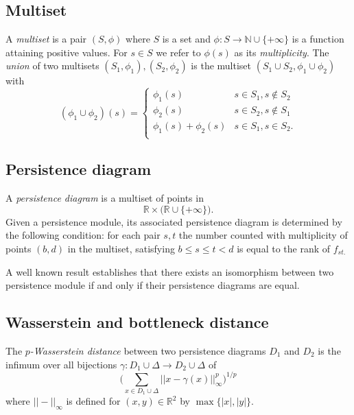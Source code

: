 \documentclass{amsart}
\begin{document}
	\subsection*{Multiset} \label{multiset}
	
	A \textit{multiset} is a pair $(S, \phi)$ where $S$ is a set and $\phi : S \to \mathbb N \cup \{+\infty\}$ is a function attaining positive values. For $s \in S$ we refer to $\phi(s)$ as its \textit{multiplicity}. The \textit{union} of two multisets $(S_1, \phi_1), (S_2, \phi_2)$ is the multiset $(S_1 \cup S_2, \phi_1 \cup \phi_2)$ with
	\begin{equation*}
	(\phi_1 \cup \phi_2)(s) = 
	\begin{cases}
	\phi_1(s) & s \in S_1, s \not\in S_2 \\
	\phi_2(s) & s \in S_2, s \not\in S_1 \\
	\phi_1(s) + \phi_2(s) & s \in S_1, s \in S_2. \\
	\end{cases}
	\end{equation*}
	
	\subsection*{Persistence diagram} \label{persistence_diagram}
	
	A \textit{persistence diagram} is a
	multiset of points in
	\begin{equation*}
	\mathbb R \times \big( \mathbb{R} \cup \{+\infty\} \big).
	\end{equation*}	
	Given a 
	persistence module, its associated persistence diagram is determined by the following condition: for each pair $s,t$ the number counted with multiplicity of points $(b,d)$ in the multiset, satisfying $b \leq s \leq t < d$ is equal to the rank of $f_{st.}$
	
	A well known result establishes that there exists an isomorphism between two persistence module if and only if their persistence diagrams are equal.
	
	\subsection*{Wasserstein and bottleneck distance}	\label{wasserstein_and_bottleneck_distance}
	
	The $p$\textit{-Wasserstein distance} between two persistence diagrams $D_1$ and $D_2$ is the infimum over all bijections $\gamma: D_1 \cup \Delta \to D_2 \cup \Delta$ of
	\begin{equation*}
	\Big(\sum_{x \in D_1 \cup \Delta} ||x - \gamma(x)||_\infty^p \Big)^{1/p}
	\end{equation*}
	where $||-||_\infty$ is defined for $(x,y) \in \mathbb R^2$ by $\max\{|x|, |y|\}$. 
	
\end{document}
